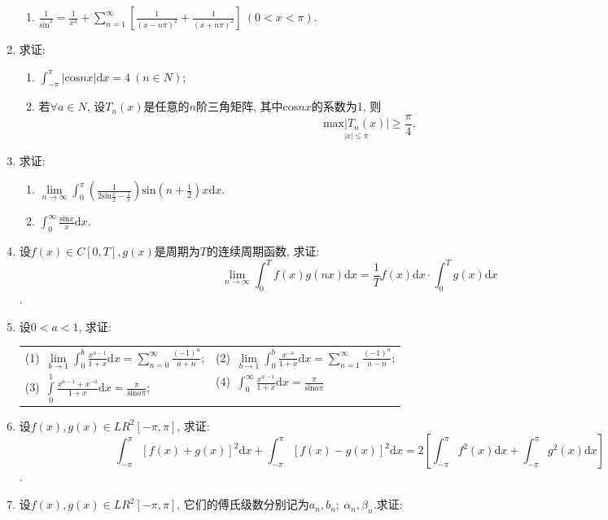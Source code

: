 \begin{enumerate}
\begin{enumerate}
	\item $\frac{1}{\mathrm{sin}^2}=\frac{1}{x^2}+\sum\limits_{n=1}^{\infty}[\frac{1}{(x-n\pi)^2}+\frac{1}{(x+n\pi)^2}]\ (0<x<\pi)$.
\end{enumerate}
\item 求证:
\begin{enumerate}
	\item $\displaystyle{\int_{-\pi}^{\pi}|\mathrm{cos}nx|}\mathrm{d}x=4\ (n\in N)$;
	\item 若$\forall a\in N$, 设$T_n(x)$是任意的$n$阶三角矩阵, 其中$\mathrm{cos}nx$的系数为1, 则$$
	\underset{|x|\le \pi}{\mathrm{max}|T_n(x)|}\ge \frac{\pi}{4}.$$
\end{enumerate}
\item 求证:
\begin{enumerate}
	\item $\displaystyle{\lim\limits_{n\rightarrow \infty}\int_{0}^{\pi}(\frac{1}{2\mathrm{sin}\frac{x}{2}-\frac{1}{x}})\mathrm{sin}(n+\frac{1}{2})x\mathrm{d}x}$.
	\item $\displaystyle{\int_{0}^{\infty}\frac{\mathrm{sin}x}{x}\mathrm{d}x}$.
\end{enumerate}
\item 设$f(x)\in C[0,T], g(x)$是周期为$T$的连续周期函数, 求证:
$$\displaystyle{\lim\limits_{n\rightarrow \infty}\int_{0}^{T}f(x)g(nx)\mathrm{d}x=\frac{1}{T}f(x)\mathrm{d}x\cdot \int_{0}^{T}g(x)\mathrm{d}x}$$.
\item 设$0<a<1$, 求证:
\begin{table}[H]
	\begin{tabular}{ll}
	(1)\ $\displaystyle{\lim\limits_{b\rightarrow 1}\int_{0}^{b}\frac{x^{a-1}}{1+x}\mathrm{d}x=\sum\limits_{n=0}^{\infty}\frac{(-1)^n}{a+n}}$;\qquad \qquad \qquad \qquad \qquad &(2)\ $\displaystyle{\lim\limits_{b\rightarrow 1}\int_{0}^{b}\frac{x^{-a}}{1+x}}\mathrm{d}x=\sum\limits_{n=1}^{\infty}\frac{(-1)^n}{a-n}$;\\
(3)\ $\displaystyle{\int\limits_{0}^{1}\frac{x^{a-1}+x^{-a}}{1+x}\mathrm{d}x=\frac{\pi}{\mathrm{sin}a\pi}}$;\qquad \qquad \qquad \qquad \qquad &(4)\ $\displaystyle{\int_{0}^{\infty}\frac{x^{a-1}}{1+x}\mathrm{d}x=\frac{\pi}{\mathrm{sin}a\pi}}$
	\end{tabular}
\end{table}
\item 设$f(x),g(x)\in LR^2[-\pi,\pi]$, 求证:
$$\displaystyle{\int_{-\pi}^{\pi}[f(x)+g(x)]^2\mathrm{d}x+\int_{-\pi}^{\pi}[f(x)-g(x)]^2\mathrm{d}x=2[\int_{-\pi}^{\pi}f^2(x)\mathrm{d}x+\int_{-\pi}^{\pi}g^2(x)\mathrm{d}x]}$$.
\item 设$f(x),g(x)\in LR^2[-\pi,\pi]$, 它们的傅氏级数分别记为$a_n,b_n;\ \alpha_n,\beta_n$.求证:

\end{enumerate}
